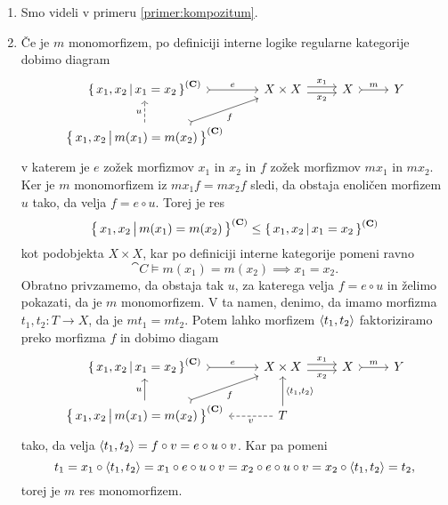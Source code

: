 \documentclass[../kategoricna_logika.tex]{subfiles}
\begin{document}
\begin{dokaz}
  \begin{enumerate}[label=(\roman*)]
  \item Smo videli v primeru \ref{primer:kompozitum}.

  \item Če je $m$ monomorfizem, po definiciji interne logike regularne
    kategorije dobimo diagram
    \begin{equation*}
      \begin{tikzcd}
        \setb{x_1,x_2}{x_1 = x_2}^{(\cat{C})} \ar[r, tail, "e"] & X \times X \ar[r, shift left, "x_1"] \ar[r, shift right, "x_2"'] & X \ar[r, tail, "m"] & Y \\
        \setb{x_1,x_2}{m(x_1) = m(x_2)}^{(\cat{C})} \ar[ur, tail,
        "f"'] \ar[u, dashed, "u"]
      \end{tikzcd}
    \end{equation*}
    v katerem je $e$ zožek morfizmov $x_1$ in $x_2$ in $f$ zožek
    morfizmov $m x_1$ in $m x_2$.  Ker je $m$ monomorfizem iz
    $m x_1 f = m x_2 f$ sledi, da obstaja enoličen morfizem $u$ tako,
    da velja $f = e \circ u$. Torej je res
      $$\left\lbrace\, x_1,x_2 \,\middle|\, m(x_1) = m(x_2) \,\right\rbrace^{({\operatorname{\mathbf{C}}})} \leq \left\lbrace\, x_1,x_2 \,\middle|\, x_1 = x_2 \,\right\rbrace^{({\operatorname{\mathbf{C}}})}$$
      kot podobjekta $X \times X$, kar po definiciji interne
      kategorije pomeni ravno
      \[\cat{C} \models m(x_1) = m(x_2) \implies x_1 = x_2.\]
      Obratno privzamemo, da obstaja tak $u$, za katerega velja
      $f = e \circ u$ in želimo pokazati, da je $m$ monomorfizem.  V
      ta namen, denimo, da imamo morfizma $t_1, t_2 : T \to X$, da je
      $m t_1 = m t_2$.  Potem lahko morfizem $\langle t_1, t_2 \rangle$
      faktoriziramo preko morfizma $f$ in dobimo diagam
      \begin{equation*}
        \begin{tikzcd}
          \setb{x_1,x_2}{x_1 = x_2}^{(\cat{C})} \ar[r, tail, "e"] & X \times X \ar[r, shift left, "x_1"] \ar[r, shift right, "x_2"'] & X \ar[r, tail, "m"] & Y \\
          \setb{x_1,x_2}{m(x_1) = m(x_2)}^{(\cat{C})} \ar[ur, tail,
          "f"'] \ar[u, "u"] & T \ar[u, "\fprod{t_1, t_2}"'] \ar[l,
          dashed, "v"]
        \end{tikzcd}
      \end{equation*}
      tako, da velja
      $\langle t_1, t_2 \rangle = f \circ v = e \circ u \circ v$. Kar pa
      pomeni
      $$t_1 = x_1 \circ \langle t_1, t_2 \rangle = x_1 \circ e \circ u \circ v = x_2 \circ e \circ u \circ v = x_2 \circ \langle t_1, t_2 \rangle = t_2,$$
      torej je $m$ res monomorfizem.


\end{enumerate}
\end{dokaz}
\end{document}
